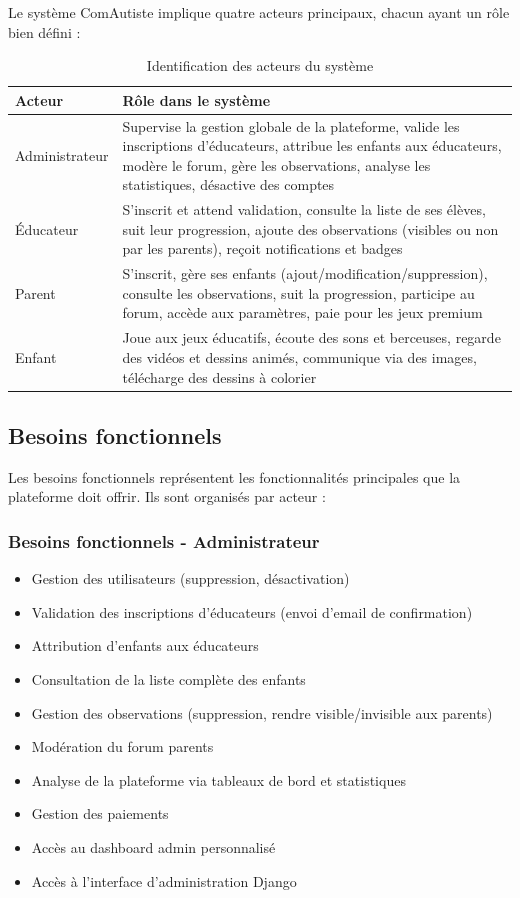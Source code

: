 \documentclass[12pt,a4paper]{report}
\begin{document}
Le système ComAutiste implique quatre acteurs principaux, chacun ayant un rôle bien défini :

\begin{table}[h]
\centering
\begin{tabular}{|p{3cm}|p{11cm}|}
\hline
\textbf{Acteur} & \textbf{Rôle dans le système} \\
\hline
Administrateur & Supervise la gestion globale de la plateforme, valide les inscriptions d'éducateurs, attribue les enfants aux éducateurs, modère le forum, gère les observations, analyse les statistiques, désactive des comptes \\
\hline
Éducateur & S'inscrit et attend validation, consulte la liste de ses élèves, suit leur progression, ajoute des observations (visibles ou non par les parents), reçoit notifications et badges \\
\hline
Parent & S'inscrit, gère ses enfants (ajout/modification/suppression), consulte les observations, suit la progression, participe au forum, accède aux paramètres, paie pour les jeux premium \\
\hline
Enfant & Joue aux jeux éducatifs, écoute des sons et berceuses, regarde des vidéos et dessins animés, communique via des images, télécharge des dessins à colorier \\
\hline
\end{tabular}
\caption{Identification des acteurs du système}
\end{table}

\subsection{Besoins fonctionnels}

Les besoins fonctionnels représentent les fonctionnalités principales que la plateforme doit offrir. Ils sont organisés par acteur :

\subsubsection{Besoins fonctionnels - Administrateur}

\begin{itemize}
    \item Gestion des utilisateurs (suppression, désactivation)
    \item Validation des inscriptions d'éducateurs (envoi d'email de confirmation)
    \item Attribution d'enfants aux éducateurs
    \item Consultation de la liste complète des enfants
    \item Gestion des observations (suppression, rendre visible/invisible aux parents)
    \item Modération du forum parents
    \item Analyse de la plateforme via tableaux de bord et statistiques
    \item Gestion des paiements
    \item Accès au dashboard admin personnalisé
    \item Accès à l'interface d'administration Django
\end{itemize}
\end{document}

